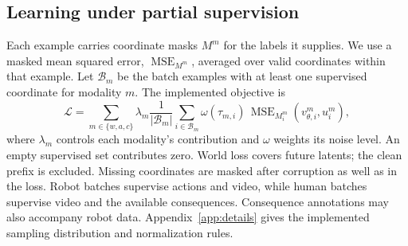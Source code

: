 \subsection{Learning under partial supervision}
Each example carries coordinate masks $M^m$ for the labels it supplies. We use a masked mean squared
error, $\operatorname{MSE}_{M^m}$, averaged over valid coordinates within that example. Let
$\mathcal{B}_m$ be the batch examples with at least one supervised coordinate for modality $m$. The
implemented objective is
\begin{equation}
 \mathcal{L}=\sum_{m\in\{w,a,c\}}\lambda_m
 \frac{1}{|\mathcal{B}_m|}
 \sum_{i\in\mathcal{B}_m}
 \omega(\tau_{m,i})\,
 \operatorname{MSE}_{M_i^m}\!\left(v^m_{\theta,i},u_i^m\right),
 \label{eq:objective}
\end{equation}
where $\lambda_m$ controls each modality's contribution and $\omega$ weights its noise level. An
empty supervised set contributes zero. World loss covers future latents; the clean prefix is
excluded. Missing coordinates are masked after corruption as well as in the loss. Robot batches
supervise actions and video, while human batches supervise video and the available consequences.
Consequence annotations may also accompany robot data. Appendix~\ref{app:details} gives the
implemented sampling distribution and normalization rules.
